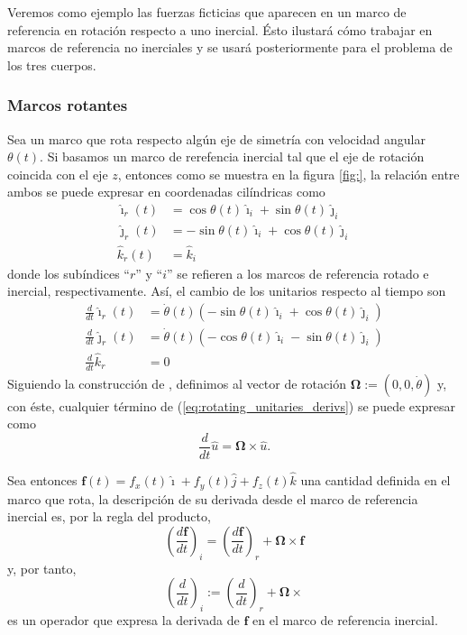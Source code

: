 Veremos como ejemplo las fuerzas ficticias que aparecen en un marco de referencia en rotación respecto a uno inercial. Ésto ilustará cómo trabajar en marcos de referencia no inerciales y se usará posteriormente para el problema de los tres cuerpos. 

\subsubsection{Marcos rotantes}

Sea un marco que rota respecto algún eje de simetría con velocidad angular $\theta(t)$. Si basamos un marco de rerefencia inercial tal que el eje de rotación coincida con el eje $z$, entonces como se muestra en la figura \ref{fig:}, la relación entre ambos se puede expresar en coordenadas cilíndricas como
\begin{align}
 \hat{\imath}_r(t) &= \cos \theta(t) \hat{\imath}_i + \sin \theta(t) \hat{\jmath}_i \nonumber \\
 \hat{\jmath}_r(t) &= -\sin \theta(t) \hat{\imath}_i + \cos \theta(t) \hat{\jmath}_i \\
 \hat{k}_r(t) &= \hat{k}_i \nonumber
 \label{eq:rotating_unitaries}
\end{align}
donde los subíndices ``$r$'' y ``$i$'' se refieren a los marcos de referencia rotado e inercial, respectivamente. Así, el cambio de los unitarios respecto al tiempo son
\begin{align}
 \frac{d}{dt} \hat{\imath}_r(t) &= \dot{\theta}(t) \left( -\sin \theta(t) \hat{\imath}_i + \cos \theta(t) \hat{\jmath}_i  \right) \nonumber \\
 \frac{d}{dt} \hat{\jmath}_r(t) &= \dot{\theta}(t) \left( -\cos \theta(t) \hat{\imath}_i - \sin \theta(t) \hat{\jmath}_i \right) \\
 \frac{d}{dt} \hat{k}_r &= 0 \nonumber 
 \label{eq:rotating_unitaries_derivs}
\end{align}
Siguiendo la construcción de \cite{wiki_rotating_frame}, definimos al vector de rotación $\mathbf{\Omega} := \left( 0, 0, \dot{\theta} \right)$ y, con éste, cualquier término de (\ref{eq:rotating_unitaries_derivs}) se puede expresar como 
\begin{equation}
 \frac{d}{dt}\hat{u} = \mathbf{\Omega} \times \hat{u}.
\end{equation}

Sea entonces $\mathbf{f}(t) = f_x(t) \hat{\imath} + f_y(t) \hat{j} + f_z(t) \hat{k}$ una cantidad definida en el marco que rota, la descripción de su derivada desde el marco de referencia inercial es, por la regla del producto,
\begin{equation*}
 \left( \frac{d \mathbf{f}}{dt} \right)_i = \left( \frac{d\mathbf{f}}{dt} \right)_r  + \mathbf{\Omega} \times \mathbf{f}
\end{equation*}
y, por tanto,
\begin{equation}
 \left(\frac{d}{dt}\right)_i := \left( \frac{d}{dt} \right)_r + \mathbf{\Omega} \times
 \label{eq:rotating_derivative}
\end{equation}
es un operador que expresa la derivada de $\mathbf{f}$ en el marco de referencia inercial.

